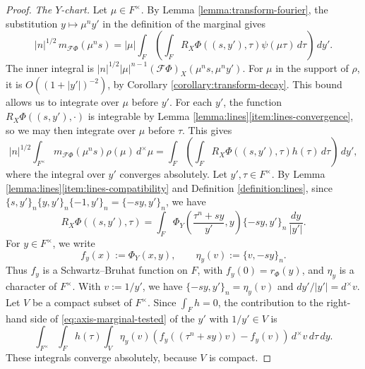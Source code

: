 \documentclass[reqno]{amsart}
\theoremstyle{plain}
\theoremstyle{definition}
\theoremstyle{itplain}
\numberwithin{equation}{section}
\numberwithin{theorem}{section}
\begin{document}
\begin{proof}
  \emph{The $Y$-chart.}  Let $\mu \in F^\times$.  By Lemma \ref{lemma:transform-fourier}, the substitution $y \mapsto \mu^n y'$ in the definition of the marginal gives
  \begin{equation*}
    \lvert n \rvert^{1/2} \, m_{\mathcal{F} \Phi}(\mu^n s) = \lvert \mu \rvert \int_F \left( \int_F R_X \Phi((s, y'), \tau) \psi(\mu \tau) \, d \tau \right) \, d y'.
  \end{equation*}
  The inner integral is $\lvert n \rvert^{1/2} \lvert \mu \rvert^{n-1} (\mathcal{F} \Phi)_X(\mu^n s, \mu^n y')$.  For $\mu$ in the support of $\rho$, it is $O((1 + \lvert y' \rvert)^{-2})$, by Corollary \ref{corollary:transform-decay}.  This bound allows us to integrate over $\mu$ before $y'$.  For each $y'$, the function $R_X \Phi((s, y'), \cdot)$ is integrable by Lemma \ref{lemma:lines}\eqref{item:lines-convergence}, so we may then integrate over $\mu$ before $\tau$.  This gives
  \begin{equation}\label{eq:axis-marginal-tested}
    \lvert n \rvert^{1/2} \int_{F^\times} m_{\mathcal{F} \Phi}(\mu^n s) \rho(\mu) \, d^\times \mu
    = \int_F \left( \int_F R_X \Phi((s, y'), \tau) h(\tau) \, d \tau \right) \, d y',
  \end{equation}
  where the integral over $y'$ converges absolutely.  Let $y', \tau \in F^\times$.  By Lemma \ref{lemma:lines}\eqref{item:lines-compatibility} and Definition \ref{definition:lines}, since $\{s, y'\}_n \{y, y'\}_n \{-1, y'\}_n = \{- s y, y'\}_n$, we have
  \begin{equation*}
    R_X \Phi((s, y'), \tau) = \int_F \Phi_Y \left( \frac{\tau^n + s y}{y'}, y \right) \{- s y, y'\}_n \, \frac{d y}{\lvert y' \rvert}.
  \end{equation*}
  For $y \in F^\times$, we write
  \begin{equation*}
    f_y(x) := \Phi_Y(x, y),
    \qquad
    \eta_y(v) := \{v, - s y\}_n.
  \end{equation*}
  Thus $f_y$ is a Schwartz--Bruhat function on $F$, with $f_y(0) = r_\Phi(y)$, and $\eta_y$ is a character of $F^\times$.  With $v := 1 / y'$, we have $\{- s y, y'\}_n = \eta_y(v)$ and $d y' / \lvert y' \rvert = d^\times v$.  Let $V$ be a compact subset of $F^\times$.  Since $\int_F h = 0$, the contribution to the right-hand side of \eqref{eq:axis-marginal-tested} of the $y'$ with $1 / y' \in V$ is
  \begin{equation}\label{eq:axis-marginal-truncated}
    \int_{F^\times} \int_F h(\tau) \int_V \eta_y(v) \left( f_y((\tau^n + s y) v) - f_y(v) \right) \, d^\times v \, d \tau \, d y.
  \end{equation}
  These integrals converge absolutely, because $V$ is compact.


\end{proof}
\end{document}
